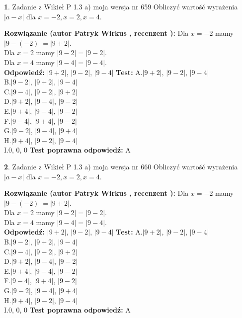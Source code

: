\documentclass[12pt, a4paper]{article}
\theoremstyle{definition} %
\newtheorem{zad}{}
\newcommand{\zadStart}[1]{\begin{zad}#1\newline}
\newcommand{\zadStop}{\end{zad}}
\newcommand{\rozwStart}[2]{\noindent \textbf{Rozwiązanie (autor #1 , recenzent #2): }\newline}
\newcommand{\rozwStop}{\newline}
\newcommand{\odpStart}{\noindent \textbf{Odpowiedź:}\newline}
\newcommand{\odpStop}{\newline}
\newcommand{\testStart}{\noindent \textbf{Test:}\newline}
\newcommand{\testStop}{\newline}
\newcommand{\kluczStart}{\noindent \textbf{Test poprawna odpowiedź:}\newline}
\newcommand{\kluczStop}{\newline}
\begin{document}
\zadStart{Zadanie z Wikieł P 1.3 a) moja wersja nr 659}
Obliczyć wartość wyrażenia $|a - x|$ dla $x=-2,x=2,x=4$.
\zadStop
\rozwStart{Patryk Wirkus}{}
Dla $x = -2$ mamy $|9 - (-2)| = |9 + 2|$.\\
Dla $x = 2$ mamy $|9 - 2| = |9 - 2|$.\\
Dla $x = 4$ mamy $|9 - 4| = |9 - 4|$.\\
\rozwStop
\odpStart
$|9 + 2|$, $|9 - 2|$, $|9 - 4|$
\odpStop
\testStart
A.$|9 + 2|$, $|9 - 2|$, $|9 - 4|$\\
B.$|9 - 2|$, $|9 + 2|$, $|9 - 4|$\\
C.$|9 - 4|$, $|9 - 2|$, $|9 + 2|$\\
D.$|9 + 2|$, $|9 - 4|$, $|9 - 2|$\\
E.$|9 + 4|$, $|9 - 4|$, $|9 - 2|$\\
F.$|9 - 4|$, $|9 + 4|$, $|9 - 2|$\\
G.$|9 - 2|$, $|9 - 4|$, $|9 + 4|$\\
H.$|9 + 4|$, $|9 - 2|$, $|9 - 4|$\\
I.$0$, $0$, $0$
\testStop
\kluczStart
A
\kluczStop



\zadStart{Zadanie z Wikieł P 1.3 a) moja wersja nr 660}
Obliczyć wartość wyrażenia $|a - x|$ dla $x=-2,x=2,x=4$.
\zadStop
\rozwStart{Patryk Wirkus}{}
Dla $x = -2$ mamy $|9 - (-2)| = |9 + 2|$.\\
Dla $x = 2$ mamy $|9 - 2| = |9 - 2|$.\\
Dla $x = 4$ mamy $|9 - 4| = |9 - 4|$.\\
\rozwStop
\odpStart
$|9 + 2|$, $|9 - 2|$, $|9 - 4|$
\odpStop
\testStart
A.$|9 + 2|$, $|9 - 2|$, $|9 - 4|$\\
B.$|9 - 2|$, $|9 + 2|$, $|9 - 4|$\\
C.$|9 - 4|$, $|9 - 2|$, $|9 + 2|$\\
D.$|9 + 2|$, $|9 - 4|$, $|9 - 2|$\\
E.$|9 + 4|$, $|9 - 4|$, $|9 - 2|$\\
F.$|9 - 4|$, $|9 + 4|$, $|9 - 2|$\\
G.$|9 - 2|$, $|9 - 4|$, $|9 + 4|$\\
H.$|9 + 4|$, $|9 - 2|$, $|9 - 4|$\\
I.$0$, $0$, $0$
\testStop
\kluczStart
A
\kluczStop
\end{document}

